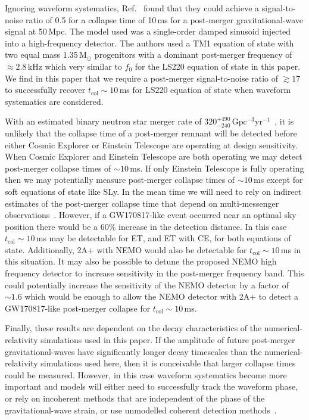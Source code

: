 \documentclass[
reprint,
prd,
twocolumn,
nofootinbib,
tightenlines %
floatfix,
 amsmath,
showpacs ,amssymb, aps,%
superscriptaddress
]{revtex4-1}
\newcommand{\tc}{t_{\mathrm{col}}}
\begin{document}
    Ignoring waveform systematics, Ref.~\cite{Zhang2021} found that they could achieve a signal-to-noise ratio of 0.5 for a collapse time of 10\,ms for a post-merger gravitational-wave signal at 50\,Mpc.
    The model used was a single-order damped sinusoid injected into a high-frequency detector.
    The authors used a TM1 equation of state with two equal mass 1.35\,M$_\odot$ progenitors with a dominant post-merger frequency of $\approx 2.8$\,kHz which very similar to $f_0$ for the LS220 equation of state in this paper.
    We find in this paper that we require a post-merger signal-to-noise ratio of $\gtrsim 17$ to successfully recover $\tc\sim\!10$\,ms for LS220 equation of state when waveform systematics are considered.
    
    With an estimated binary neutron star merger rate of $320^{+490}_{-240}\,\mathrm{Gpc^{-3}yr^{-1}}$~\cite{PopGWTC2}, it is unlikely that the collapse time of a post-merger remnant will be detected before either Cosmic Explorer or Einstein Telescope are operating at design sensitivity.
    When Cosmic Explorer and Einstein Telescope are both operating we may detect post-merger collapse times of $\sim\!10$\,ms.
    If only Einstein Telescope is fully operating then we may potentially measure post-merger collapse times of $\sim\!10$\,ms except for soft equations of state like SLy.
    In the mean time we will need to rely on indirect estimates of the post-merger collapse time that depend on multi-messenger observations~\cite[e.g.,][]{Metzger2018,Gill2019,Murguia-Berthier2020,Yu2018}.
    However, if a GW170817-like event occurred near an optimal sky position there would be a 60\% increase in the detection distance.
    In this case $\tc \sim\!10$\,ms may be detectable for ET, and ET with CE, for both equations of state.
    Additionally, 2A+ with NEMO would also be detectable for $\tc \sim 10$\,ms in this situation.
    It may also be possible to detune the proposed NEMO high frequency detector to increase sensitivity in the post-merger frequency band.
    This could potentially increase the sensitivity of the NEMO detector by a factor of $\sim\!1.6$ which would be enough to allow the NEMO detector with 2A+ to detect a GW170817-like post-merger collapse for $\tc \sim\! 10$\,ms. \par
    Finally, these results are dependent on the decay characteristics of the numerical-relativity simulations used in this paper.
    If the amplitude of future post-merger gravitational-waves have significantly longer decay timescales than the numerical-relativity simulations used here, then it is conceivable that larger collapse times could be measured.
    However, in this case waveform systematics become more important and models will either need to successfully track the waveform phase, or rely on incoherent methods that are independent of the phase of the gravitational-wave strain, or use unmodelled coherent detection methods~\cite[e.g.,][]{GW170817postmerger1,GW170817Postmerger2}.
    
\end{document}
